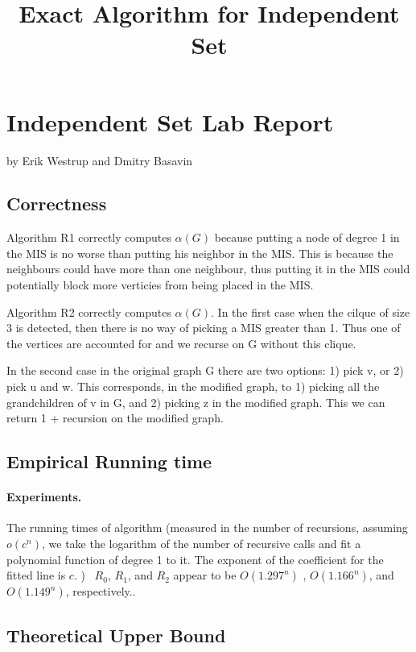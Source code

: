 \documentclass{tufte-handout}
\title{\sf Exact Algorithm for Independent Set}
\author{}
\begin{document}
\maketitle

\section{Independent Set Lab Report}
by Erik Westrup and Dmitry Basavin

\subsection{Correctness}
Algorithm R1 correctly computes $\alpha(G)$ because putting a node of degree 1 in the MIS is no worse than putting his neighbor in the MIS. This is because the neighbours could have more than one neighbour, thus putting it in the MIS could potentially block more verticies from being placed in the MIS.

\noindent
Algorithm R2 correctly computes $\alpha(G)$. In the first case when the cilque of size 3 is detected, then there is no way of picking a MIS greater than 1. Thus one of the vertices are accounted for and we recurse on G without this clique.

In the second case in the original graph G there are two options: 1) pick v, or 2) pick u and w. This corresponds, in the modified graph, to 1) picking all the grandchildren of v in G, and  2) picking z in the modified graph. This we can return 1 + recursion on the modified graph.

\subsection{Empirical Running time}

\paragraph{Experiments.}

\medskip
\noindent

    

The running times of algorithm (measured in the number of recursions, assuming $o(c^n)$, we take the logarithm of the number of recursive calls and fit a polynomial function of degree 1 to it. The exponent of the coefficient for the fitted line is $c$. ) ~$R_0$, $R_1$, and $R_2$ appear to be
$O(1.297^n)$ , $O(1.166^n)$, and $O(1.149^n)$, respectively..

\subsection{Theoretical Upper Bound}
\end{document}
